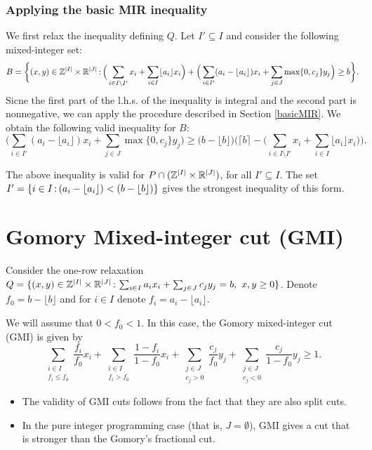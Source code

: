 \documentclass[../open-optimization/open-optimization.tex]{subfiles}
\begin{document}
\subsubsection{Applying the basic MIR inequality}
We first relax the inequality defining $Q$. Let $I'\subseteq I$ and  consider the following mixed-integer set:
$$B=\bigg\{(x,y)\in {\mathbb{Z}}^{|I|}\times {\mathbb{R}}^{|J|}{\,:\,}\Big(\sum_{i\in I\setminus I'}x_i + \sum_{i\in I}\lfloor a_i\rfloor x_i\Big)+\Big(\sum_{i\in I'}(a_i-\lfloor a_i\rfloor)x_i+ \sum_{j\in J}\max\{0,c_j\}y_j\Big)\geq b\bigg\}.$$
Sicne the first part of the l.h.s. of the inequality is integral and the second part is nonnegative, we can apply the procedure described in Section \ref{basicMIR}. We obtain the following valid inequality for $B$:
$$\Big(\sum_{i\in I'}(a_i-\lfloor a_i\rfloor)x_i+ \sum_{j\in J}\max\{0,c_j\}y_j\Big)\geq \big(b-\lfloor b \rfloor\big)\bigg(\lceil b\rceil - \Big(\sum_{i\in I\setminus I'}x_i + \sum_{i\in I}\lfloor a_i\rfloor x_i\Big)\bigg).$$
\begin{remark}
The above inequality is valid for $P\cap ({\mathbb{Z}}^{|I|}\times {\mathbb{R}}^{|J|})$, for all $I'\subseteq I$. The set $I'=\{i\in I{\,:\,} (a_i-\lfloor a_i\rfloor)<(b-\lfloor b\rfloor)\}$ gives the strongest inequality of this form.
\end{remark}

\section{Gomory Mixed-integer cut (GMI)}
Consider the one-row relaxation $Q=\{(x,y)\in {\mathbb{Z}}^{|I|}\times {\mathbb{R}}^{|J|}{\,:\,} \sum_{i\in I}a_ix_i+\sum_{j\in J}c_jy_j= b,\ x,y\geq0\}$. Denote $f_0=b-\lfloor b\rfloor$ and for $i\in I$ denote $f_i=a_i-\lfloor a_i\rfloor$. 

We will assume that $0<f_0<1$. In this case, the Gomory mixed-integer cut (GMI) is given by
$$\sum_{\substack{i\in I\\f_i\leq f_0}}\frac{f_i}{f_0}x_i + \sum_{\substack{i\in I\\f_i> f_0}}\frac{1-f_i}{1-f_0}x_i+\sum_{\substack{j\in J\\c_j>0}}\frac{c_j}{f_0}y_j+\sum_{\substack{j\in J\\c_j<0}}\frac{c_j}{1-f_0}y_j\geq 1.$$

\begin{remark}
\text{ }
\begin{itemize}
	\item The validity of GMI cuts follows from the fact that they are also split cuts.
	\item In the pure integer programming case (that is, $J=\emptyset$), GMI gives a cut that is stronger than the Gomory's fractional cut.
\end{itemize}
\end{remark}




\end{document}
